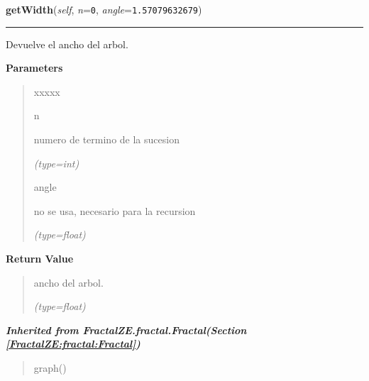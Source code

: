 \hspace{.8\funcindent}\begin{boxedminipage}{\funcwidth}

    \raggedright \textbf{getWidth}(\textit{self}, \textit{n}={\tt 0}, \textit{angle}={\tt 1.57079632679})

    \vspace{-1.5ex}

    \rule{\textwidth}{0.5\fboxrule}
\setlength{\parskip}{2ex}
    Devuelve el ancho del arbol.

\setlength{\parskip}{1ex}
      \textbf{Parameters}
      \vspace{-1ex}

      \begin{quote}
        \begin{Ventry}{xxxxx}

          \item[n]

          numero de termino de la sucesion

            {\it (type=int)}

          \item[angle]

          no se usa, necesario para la recursion

            {\it (type=float)}

        \end{Ventry}

      \end{quote}

      \textbf{Return Value}
    \vspace{-1ex}

      \begin{quote}
      ancho del arbol.

      {\it (type=float)}

      \end{quote}

    \end{boxedminipage}


\large{\textbf{\textit{Inherited from FractalZE.fractal.Fractal\textit{(Section \ref{FractalZE:fractal:Fractal})}}}}

\begin{quote}
graph()
\end{quote}
